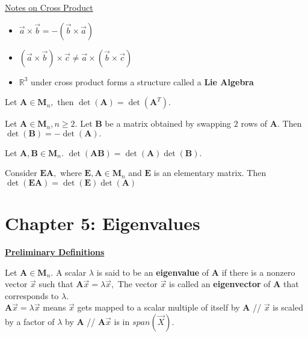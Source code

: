 \documentclass{article}
\begin{document}
\underline{Notes on Cross Product}
\begin{itemize}
    \item $\vec{a} \times \vec{b} = -(\vec{b} \times \vec{a})$
    
    \item $(\vec{a} \times \vec{b}) \times \vec{c} \neq \vec{a} \times (\vec{b} \times \vec{c})$
    
    \item $\mathbb{R}^3$ under cross product forms a structure called a \textbf{Lie Algebra}
\end{itemize}

\begin{theorem}
Let $\boldsymbol{A} \in \boldsymbol{M}_n,$ then $\det(\boldsymbol{A}) = \det(\boldsymbol{A}^{T}).$
\end{theorem}

\begin{theorem}
Let $\boldsymbol{A} \in \boldsymbol{M}_n, n \geq 2$. Let $\boldsymbol{B}$ be a matrix obtained by swapping $2$ rows of $\boldsymbol{A}.$ Then $\det(\boldsymbol{B}) = -\det(\boldsymbol{A}).$
\end{theorem}

\begin{theorem}
Let $\boldsymbol{A, B} \in \boldsymbol{M}_n.$ $\det(\boldsymbol{AB}) = \det(\boldsymbol{A})\det(\boldsymbol{B}).$
\end{theorem}

\begin{lemma}
Consider $\boldsymbol{EA},$ where $\boldsymbol{E, A} \in \boldsymbol{M}_n$ and $\boldsymbol{E}$ is an elementary matrix. Then $\det(\boldsymbol{EA}) =\det(\boldsymbol{E})\det(\boldsymbol{A})$
\end{lemma}

\newpage
\section{Chapter 5: Eigenvalues}
\textbf{\underline{Preliminary Definitions}}

\begin{definition}
Let $\boldsymbol{A} \in \boldsymbol{M}_n.$ A scalar $\lambda$ is said to be an \textbf{eigenvalue} of $\boldsymbol{A}$ if there is a nonzero vector $\vec{x}$ such that $\boldsymbol{A}\vec{x} = \lambda\vec{x},$ The vector $\vec{x}$ is called an \textbf{eigenvector} of $\boldsymbol{A}$ that corresponds to $\lambda.$ \\

$\boldsymbol{A}\vec{x} = \lambda \vec{x}$ means $\vec{x}$ gets mapped to a scalar multiple of itself by $\boldsymbol{A}$ // $\vec{x}$ is scaled by a factor of $\lambda$ by $\boldsymbol{A}$ // $\boldsymbol{A}\vec{x}$ is in $span(\vec{X}).$ 
\end{definition}
\end{document}
